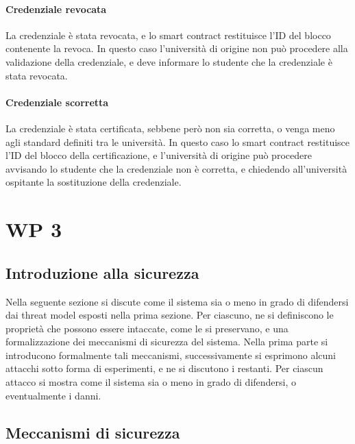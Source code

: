\documentclass[a4paper,12pt]{article}
\begin{document}
\paragraph{Credenziale revocata} La credenziale è stata revocata, e lo smart contract restituisce l'ID del blocco contenente la revoca. In questo caso l'università di origine non può procedere alla validazione della credenziale, e deve informare lo studente che la credenziale è stata revocata.
\paragraph{Credenziale scorretta} La credenziale è stata certificata, sebbene però non sia corretta, o venga meno agli standard definiti tra le università. In questo caso lo smart contract restituisce l'ID del blocco della certificazione, e l'università di origine può procedere avvisando lo studente che la credenziale non è corretta, e chiedendo all'università ospitante la sostituzione della credenziale.

\newpage
\section{WP 3}
\subsection{Introduzione alla sicurezza}
Nella seguente sezione si discute come il sistema sia o meno in grado di difendersi dai threat model esposti nella prima sezione. Per ciascuno, ne si definiscono le proprietà che possono essere intaccate, come le si preservano, e una formalizzazione dei meccanismi di sicurezza del sistema.
\newline Nella prima parte si introducono formalmente tali meccanismi, successivamente si esprimono alcuni attacchi sotto forma di esperimenti, e ne si discutono i restanti. Per ciascun attacco si mostra come il sistema sia o meno in grado di difendersi, o eventualmente i danni.
\subsection{Meccanismi di sicurezza}
\end{document}
